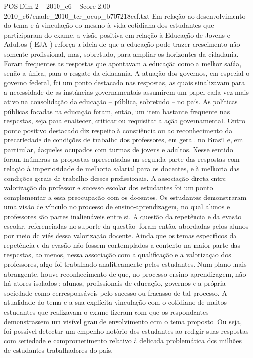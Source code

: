 \begin{textsample}{POS Dim 2 – 2010\_c6 – Score 2.00 – 2010\_c6/enade\_2010\_ter\_ocup\_b707218cef.txt}
Em relação ao desenvolvimento do tema e à vinculação do mesmo à vida cotidiana dos estudantes que participaram do exame, a visão positiva em relação à Educação de Jovens e Adultos ( EJA ) reforça a ideia de que a educação pode trazer crescimento não somente profissional, mas, sobretudo, para ampliar os horizontes da cidadania.
Foram frequentes as respostas que apontavam a educação como a melhor saída, senão a única, para o resgate da cidadania.
A atuação dos governos, em especial o governo federal, foi um ponto destacado nas respostas, as quais sinalizavam para a necessidade de as instâncias governamentais assumirem um papel cada vez mais ativo na consolidação da educação – pública, sobretudo – no país.
As políticas públicas focadas na educação foram, então, um item bastante frequente nas respostas, seja para enaltecer, criticar ou requisitar a ação governamental.
Outro ponto positivo destacado diz respeito à consciência ou ao reconhecimento da precariedade de condições de trabalho dos professores, em geral, no Brasil e, em particular, daqueles ocupados com turmas de jovens e adultos.
Nesse sentido, foram inúmeras as propostas apresentadas na segunda parte das respostas com relação à imperiosidade de melhoria salarial para os docentes, e à melhoria das condições gerais de trabalho desses profissionais.
A associação direta entre valorização do professor e sucesso escolar dos estudantes foi um ponto complementar a essa preocupação com os docentes.
Os estudantes demonstraram uma visão de vínculo no processo de ensino-aprendizagem, no qual alunos e professores são partes inalienáveis entre si.
A questão da repetência e da evasão escolar, referenciadas no suporte da questão, foram então, abordadas pelos alunos por meio do viés dessa valorização docente.
Ainda que os temas específicos da repetência e da evasão não fossem contemplados a contento na maior parte das respostas, ao menos, nessa associação com a qualificação e a valorização dos professores, algo foi trabalhado analiticamente pelos estudantes.
Num plano mais abrangente, houve reconhecimento de que, no processo ensino-aprendizagem, não há atores isolados : alunos, profissionais de educação, governos e a própria sociedade como corresponsáveis pelo sucesso ou fracasso de tal processo.
A atualidade do tema e a sua explícita vinculação com o cotidiano de muitos estudantes que realizavam o exame fizeram com que os respondentes demonstrassem um visível grau de envolvimento com o tema proposto.
Ou seja, foi possível detectar um empenho notório dos estudantes ao redigir suas respostas com seriedade e comprometimento relativo à delicada problemática dos milhões de estudantes trabalhadores do país.

\end{textsample}
